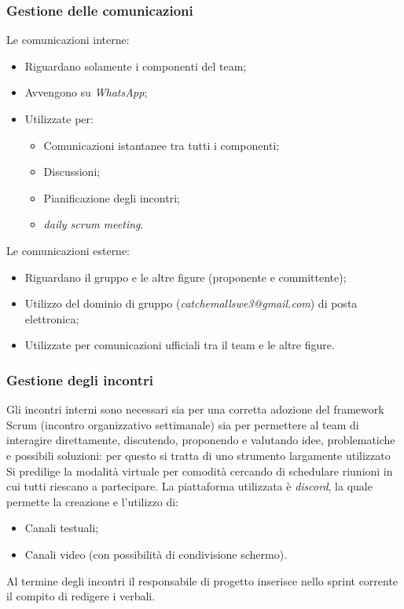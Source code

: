     \subsubsection{Gestione delle comunicazioni}
        Le comunicazioni interne:
        \begin{itemize}
            \item Riguardano solamente i componenti del team;
            \item Avvengono su \textit{WhatsApp};
            \item Utilizzate per:
                \begin{itemize}
                    \item Comunicazioni istantanee tra tutti i componenti;
                    \item Discussioni;
                    \item Pianificazione degli incontri;
                    \item \textit{daily scrum meeting}.
                \end{itemize}
        \end{itemize}
            
        Le comunicazioni esterne:
        \begin{itemize}
            \item Riguardano il gruppo e le altre figure (proponente e committente);
            \item Utilizzo del dominio di gruppo (\textit{catchemallswe3@gmail.com}) di posta elettronica;
            \item Utilizzate per comunicazioni ufficiali tra il team e le altre figure.
        \end{itemize}

        
        
    \subsubsection{Gestione degli incontri}
        Gli incontri interni sono necessari sia per una corretta adozione del framework Scrum (incontro organizzativo settimanale)
        sia per permettere al team di interagire direttamente, discutendo, proponendo e valutando idee, problematiche e possibili 
        soluzioni: per questo si tratta di uno strumento largamente utilizzato
        \newline
        Si predilige la modalità virtuale per comodità cercando di schedulare riunioni in cui tutti riescano a partecipare.
        \newline
        La piattaforma utilizzata è \textit{discord}, la quale permette la creazione e l'utilizzo di:
        \begin{itemize}
            \item Canali testuali;
            \item Canali video (con possibilità di condivisione schermo).
        \end{itemize}
        Al termine degli incontri il responsabile di progetto inserisce nello sprint corrente il compito di redigere i verbali. 

